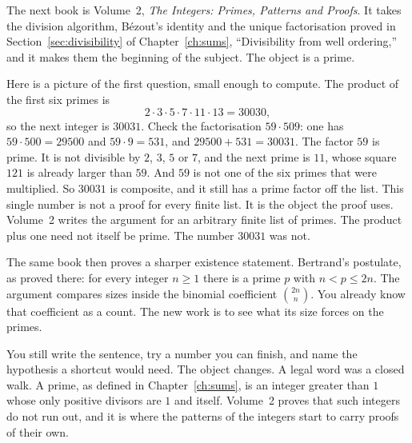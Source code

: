 The next book is Volume~2, \emph{The Integers: Primes, Patterns and Proofs}. It takes the division algorithm, B\'ezout's identity and the unique factorisation proved in Section~\ref{sec:divisibility} of Chapter~\ref{ch:sums}, ``Divisibility from well ordering,'' and it makes them the beginning of the subject. The object is a prime.

Here is a picture of the first question, small enough to compute. The product of the first six primes is
\[
2\cdot3\cdot5\cdot7\cdot11\cdot13=30030,
\]
so the next integer is $30031$. Check the factorisation $59\cdot509$: one has $59\cdot500=29500$ and $59\cdot9=531$, and $29500+531=30031$. The factor $59$ is prime. It is not divisible by $2$, $3$, $5$ or $7$, and the next prime is $11$, whose square $121$ is already larger than $59$. And $59$ is not one of the six primes that were multiplied. So $30031$ is composite, and it still has a prime factor off the list. This single number is not a proof for every finite list. It is the object the proof uses. Volume~2 writes the argument for an arbitrary finite list of primes. The product plus one need not itself be prime. The number $30031$ was not.

The same book then proves a sharper existence statement. Bertrand's postulate, as proved there: for every integer $n\ge1$ there is a prime $p$ with $n<p\le2n$. The argument compares sizes inside the binomial coefficient $\binom{2n}{n}$. You already know that coefficient as a count. The new work is to see what its size forces on the primes.

You still write the sentence, try a number you can finish, and name the hypothesis a shortcut would need. The object changes. A legal word was a closed walk. A prime, as defined in Chapter~\ref{ch:sums}, is an integer greater than $1$ whose only positive divisors are $1$ and itself. Volume~2 proves that such integers do not run out, and it is where the patterns of the integers start to carry proofs of their own.
